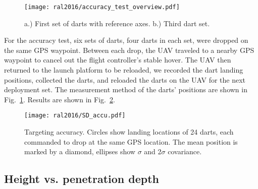 

\begin{figure} \centering
  {\texttt{[image: ral2016/accuracy\_test\_overview.pdf]}}
 \caption{a.) First set of darts with reference axes. b.) Third dart set. } 
 \label{fig:Accu_test_darts}
\end{figure}

For the accuracy test, six sets of darts, four darts in each set, were dropped on the same GPS waypoint. Between each drop, the UAV traveled to a nearby GPS waypoint to cancel out the flight controller's stable hover.
The UAV then returned to the launch platform to be reloaded, we recorded the dart landing positions, collected the darts, and reloaded the darts on the UAV for the next deployment set.
The measurement method of the darts' positions are shown in Fig.~\ref{fig:Accu_test_darts}.
Results are shown in Fig.~\ref{fig:SD_accu.pdf}.
  





\begin{figure} \centering
  {\texttt{[image: ral2016/SD\_accu.pdf]}}
 \caption{Targeting accuracy.  Circles show landing locations of 24 darts, each commanded to drop at the same GPS location. The mean position is marked by a diamond, ellipses show  $\sigma$ and 2$\sigma$ covariance.
 \label{fig:SD_accu.pdf}}
\end{figure}


\subsection{Height vs. penetration depth}

